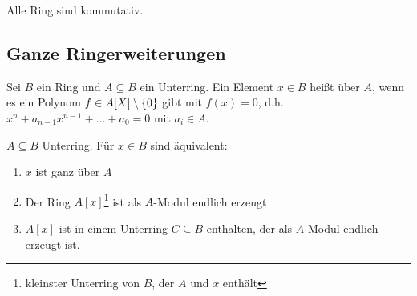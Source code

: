 \documentclass[../main.tex]{subfiles}
\begin{document}
Alle Ring sind kommutativ.
\subsection{Ganze Ringerweiterungen}
\begin{definition}
    Sei $B$ ein Ring und $A\subseteq B$ ein Unterring. Ein Element $x\in B$ heißt  über $A$, wenn es ein  Polynom $f\in A[X]\setminus \{0\}$ gibt mit $f(x)=0$, d.h. $x^n + a_{n-1}x^{n-1} + \dots + a_0 = 0$ mit $a_i\in A$.
\end{definition}
\begin{theorem}
    $A\subseteq B$ Unterring. Für $x\in B$ sind äquivalent:
    \begin{enumerate}[label=(\roman*)]
        \item $x$ ist ganz über $A$
        \item Der Ring $A[x]$\footnote{kleinster Unterring von $B$, der $A$ und $x$ enthält} ist als $A$-Modul endlich erzeugt
        \item $A[x]$ ist in einem Unterring $C\subseteq B$ enthalten, der als $A$-Modul endlich erzeugt ist.
    \end{enumerate}
\end{theorem}
\end{document}

